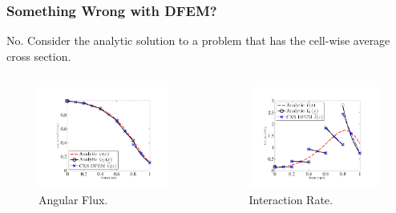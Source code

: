 \documentclass{beamer}
\begin{document}
\begin{frame}
\frametitle{Something Wrong with DFEM?}
No.  Consider the analytic solution to a problem that has the cell-wise average cross section.
\begin{columns}[c]
\begin{figure}
\includegraphics[width=5cm]{../chapter3_variable_xs/Psi_Blades.pdf}
\caption{Angular Flux.}
\end{figure}
\begin{figure}
\includegraphics[width=5cm]{../chapter3_variable_xs/I_Blades.pdf}
\caption{Interaction Rate.}
\end{figure}
\end{columns}

\end{frame}
\end{document}

